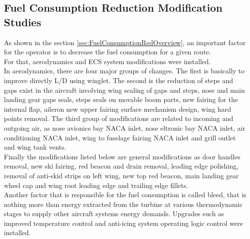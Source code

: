 \subsection{Fuel Consumption Reduction Modification Studies}
As shown in the section \ref{sec:FuelConsumptionRedOverview}, an important factor for the operator is to decrease the fuel consumption for a given route.
\\For that, aerodynamics and ECS system modifications were installed.
\\In aerodynamics, there are four major groups of changes. The first is basically to improve
directly L/D using winglet. The second is the reduction of steps and gaps exist in the
aircraft involving wing sealing of gaps and steps, nose and main landing gear gaps seals, steps seals on movable boom parts, new fairing for the internal flap, aileron new upper fairing surface mechanism design, wing hard points removal. The third group of modifications are related to incoming and outgoing air, as nose avionics bay NACA inlet, nose eltronic bay NACA inlet, air conditioning NACA inlet, wing to fuselage fairing NACA inlet and grill outlet and wing tank vents. \\Finally the modifications listed below are general modifications as door handles removal, new ski fairing, red beacon and drain removal, leading edge polishing, removal of anti-skid strips on left wing, new top red beacon, main landing gear wheel cap and wing root leading edge and trailing edge fillets.
\\Another factor that is responsible for the fuel consumption is called bleed, that is nothing more than energy extracted from the turbine at various thermodynamic stages to supply other aircraft systems energy demands. Upgrades such as improved temperature control and anti-icing system operating logic control were installed.

